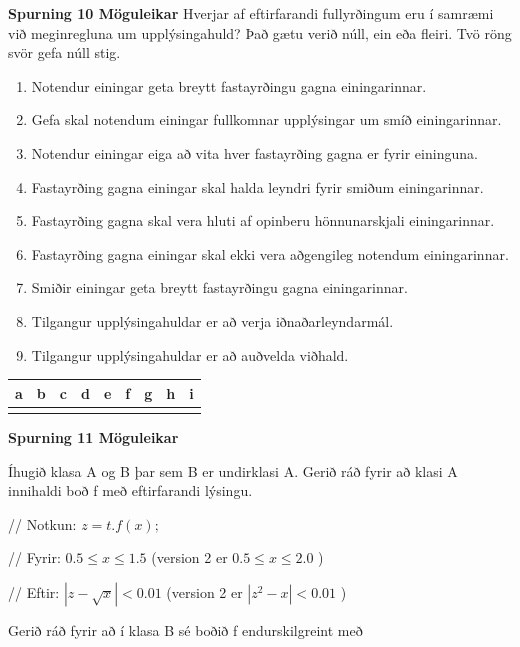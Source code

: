 \documentclass{article}
\newcommand{\bo}[1]{\textbf{#1}}
\newcommand{\enum}{\begin{enumerate}[label = \alph*.]}
\begin{document}
\vspace{2cm}

\bo{Spurning 10 Möguleikar}
Hverjar af eftirfarandi fullyrðingum eru í samræmi við meginregluna
um upplýsingahuld? Það gætu verið núll, ein eða fleiri. Tvö röng
svör gefa núll stig.

\enum
\item Notendur einingar geta breytt fastayrðingu gagna
einingarinnar.
\item Gefa skal notendum einingar fullkomnar upplýsingar um smíð
einingarinnar.
\item Notendur einingar eiga að vita hver fastayrðing gagna er fyrir
eininguna.
\item Fastayrðing gagna einingar skal halda leyndri fyrir smiðum
einingarinnar.
\item Fastayrðing gagna skal vera hluti af opinberu hönnunarskjali
einingarinnar.
\item Fastayrðing gagna einingar skal ekki vera aðgengileg
notendum einingarinnar.
\item Smiðir einingar geta breytt fastayrðingu gagna einingarinnar.
\item Tilgangur upplýsingahuldar er að verja iðnaðarleyndarmál.
\item Tilgangur upplýsingahuldar er að auðvelda viðhald.


\end{enumerate}

\begin{tabularx}{\textwidth}{|X|X|X|X|X|X|X|X|X|}
    \hline
    \bo{a} & \bo{b} & \bo{c} & \bo{d} & \bo{e} & \bo{f} & \bo{g} & \bo{h} & \bo{i} \\ \hline
     & & & & & & & & \\ \hline
\end{tabularx}



\newpage

\bo{Spurning 11 Möguleikar}

    Íhugið klasa A og B þar sem B er undirklasi A. Gerið ráð fyrir að
    klasi A innihaldi boð f með eftirfarandi lýsingu.


    // Notkun: $z = t.f(x);$


    // Fyrir: $0.5 \leq x \leq 1.5$ (version 2 er $0.5 \leq x \leq 2.0$ )


    // Eftir: $|z - \sqrt{x}| < 0.01$ (version 2 er $|z^2 - x| < 0.01$ )


    Gerið ráð fyrir að í klasa B sé boðið f endurskilgreint með
\end{document}
